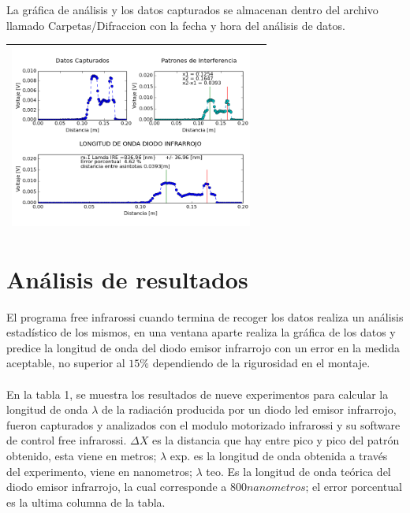 \documentclass[12]{article}
\newenvironment{Figure}
{\par\medskip\noindent\minipage{\linewidth}}
{\endminipage\par\medskip}
\begin{document}
\begin{multicols}{2}
La gráfica de análisis y los datos capturados se almacenan dentro del archivo llamado Carpetas/Difraccion con la fecha y hora del análisis de datos.
\begin{Figure}	
\center
\begin{tabular}{|l|r|}
\hline
\includegraphics[width=8cm, height=6cm]{img/Graficas.png} \\ \hline
\end{tabular}
\label{fig:g4}
\end{Figure}
\section{Análisis de resultados}
El programa free infrarossi cuando termina de recoger los datos realiza un análisis estadístico de los mismos, en una ventana aparte realiza la gráfica de los datos y predice la longitud de onda del diodo emisor infrarrojo con un error en la medida aceptable, no superior al $15\%$ dependiendo de la rigurosidad en el montaje.\\\\
En la tabla 1, se muestra los resultados de nueve experimentos para calcular la longitud de onda $\lambda$ de la radiación producida por un diodo led emisor infrarrojo, fueron capturados y analizados con el modulo motorizado infrarossi y su software de control free infrarossi. $\Delta X$ es la distancia que hay entre pico y pico del patrón obtenido, esta viene en metros; $\lambda$ exp.  es la longitud de onda obtenida a través del experimento, viene en nanometros; $\lambda$ teo. Es la longitud de onda teórica del diodo emisor infrarrojo,  la cual corresponde a $800 nanometros$; el error porcentual es la ultima columna  de la tabla.


\end{multicols}
\end{document}
